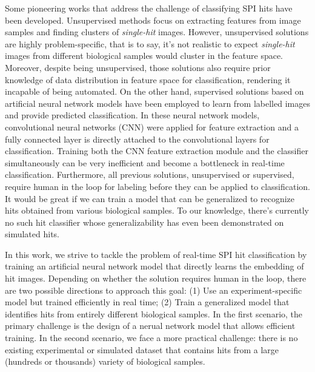Some pioneering works that address the challenge of classifying SPI hits have
been developed.  Unsupervised methods
\cite{yoonUnsupervisedClassificationSingleparticle2011,
giannakisSymmetriesImageFormation2012,schwanderSymmetriesImageFormation2012,
yoonNovelAlgorithmsCoherent2012,
andreassonAutomatedIdentificationClassification2014,
bobkovSortingAlgorithmsSingleparticle2015} focus on extracting features from
image samples and finding clusters of \textit{single-hit} images.  However,
unsupervised solutions are highly problem-specific, that is to say, it's not
realistic to expect \textit{single-hit} images from different biological samples
would cluster in the feature space.  Moreover, despite being unsupervised, those
solutions also require prior knowledge of data distribution in feature space for
classification, rendering it incapable of being automated. On the other hand,
supervised solutions based on artificial neural network models
\cite{shiEvaluationPerformanceClassification2019,
ignatenkoClassificationDiffractionPatterns2021} have been employed to learn from
labelled images and provide predicted classification.  In these neural network
models, convolutional neural networks (CNN) were applied for feature extraction
and a fully connected layer is directly attached to the convolutional layers for
classification.  Training both the CNN feature extraction module and the
classifier simultaneously can be very inefficient and become a bottleneck in
real-time classification.  Furthermore, all previous solutions, unsupervised or
supervised, require human in the loop for labeling before they can be applied to
classification.  It would be great if we can train a model that can be
generalized to recognize hits obtained from various biological samples.  To our
knowledge, there's currently no such hit classifier whose generalizability has
even been demonstrated on simulated hits.  



In this work, we strive to tackle the problem of real-time SPI hit
classification by training an artificial neural network model that directly
learns the embedding of hit images.  Depending on whether the solution requires
human in the loop, there are two possible directions to approach this goal: (1)
Use an experiment-specific model but trained efficiently in real time; (2) Train
a generalized model that identifies hits from entirely different biological
samples.  In the first scenario, the primary challenge is the design of a nerual
network model that allows efficient training.  In the second scenario, we face a
more practical challenge: there is no existing experimental or simulated dataset
that contains hits from a large (hundreds or thousands) variety of biological
samples.

